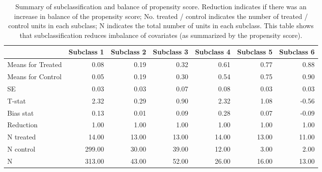 \documentclass[11pt,letterpaper]{article}
\theoremstyle{plain}
\begin{document}
\begin{table}[ht]
  \begin{center}
    \begin{tabular}{lrrrrrr}
      \hline
      & Subclass 1 & Subclass 2 & Subclass 3 & Subclass 4 & Subclass 5 & Subclass 6 \\
      \hline
      Means for Treated & 0.08 & 0.19 & 0.32 & 0.61 & 0.77 & 0.88 \\
      Means for Control & 0.05 & 0.19 & 0.30 & 0.54 & 0.75 & 0.90 \\
      SE & 0.03 & 0.03 & 0.07 & 0.08 & 0.03 & 0.03 \\
      T-stat & 2.32 & 0.29 & 0.90 & 2.32 & 1.08 & -0.56 \\
      Bias stat & 0.13 & 0.01 & 0.09 & 0.28 & 0.07 & -0.09 \\
      Reduction & 1.00 & 1.00 & 1.00 & 1.00 & 1.00 & 1.00 \\
      N treated & 14.00 & 13.00 & 13.00 & 14.00 & 13.00 & 11.00 \\
      N control & 299.00 & 30.00 & 39.00 & 12.00 & 3.00 & 2.00 \\
      N & 313.00 & 43.00 & 52.00 & 26.00 & 16.00 & 13.00 \\
      \hline
    \end{tabular}
    \caption{Summary of subclassification and balance of propensity
      score.  Reduction indicates if there was an increase in balance
      of the propensity score; No. treated / control indicates the number of
      treated / control units in each subclass; N indicates the total
      number of units in each subclass.  This table shows that
      subclassification reduces imbalance of covariates (as summarized
      by the propensity score).}
    \label{tb:kochpsub}
  \end{center}
\end{table}
\end{document}
